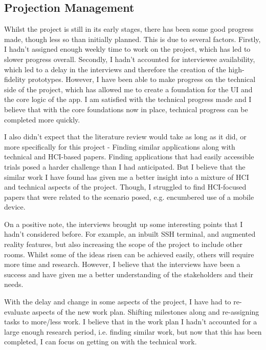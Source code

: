 \documentclass [11pt,a4paper]{article}
\begin{document}
\subsection{Projection Management}
\label{sec:project_management}

Whilst the project is still in its early stages, there has been some good progress made, though less so than initially planned. This is due to several factors. Firstly, I hadn't assigned enough weekly time to work on the project, which has led to slower progress overall. Secondly, I hadn't accounted for interviewee availability, which led to a delay in the interviews and therefore the creation of the high-fidelity prototypes. However, I have been able to make progress on the technical side of the project, which has allowed me to create a foundation for the UI and the core logic of the app. I am satisfied with the technical progress made and I believe that with the core foundations now in place, technical progress can be completed more quickly.

\pagebreak

I also didn't expect that the literature review would take as long as it did, or more specifically for this project - Finding similar applications along with technical and HCI-based papers. Finding applications that had easily accessible trials posed a harder challenge than I had anticipated. But I believe that the similar work I have found has given me a better insight into a mixture of HCI and technical aspects of the project. Though, I struggled to find HCI-focused papers that were related to the scenario posed, e.g. encumbered use of a mobile device. 

On a positive note, the interviews brought up some interesting points that I hadn't considered before. For example, an inbuilt SSH terminal, and augmented reality features, but also increasing the scope of the project to include other rooms. Whilst some of the ideas risen can be achieved easily, others will require more time and research. However, I believe that the interviews have been a success and have given me a better understanding of the stakeholders and their needs.

With the delay and change in some aspects of the project, I have had to re-evaluate aspects of the new work plan. Shifting milestones along and re-assigning tasks to more/less work. I believe that in the work plan I hadn't accounted for a large enough research period, i.e. finding similar work, but now that this has been completed, I can focus on getting on with the technical work.
\end{document}
